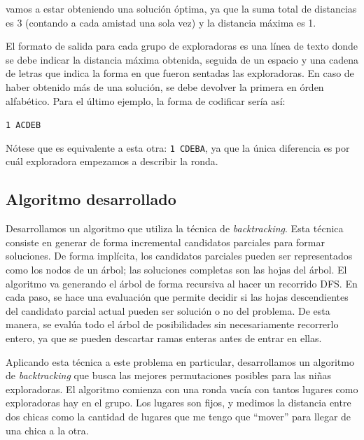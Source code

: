 vamos a estar obteniendo una solución óptima, ya que la suma total de distancias es 3 (contando a cada amistad una sola vez) y la distancia máxima es 1.

El formato de salida para cada grupo de exploradoras es una línea de texto donde se debe indicar la distancia máxima obtenida, seguida de un espacio y una cadena de letras que indica la forma en que fueron sentadas las exploradoras. En caso de haber obtenido más de una solución, se debe devolver la primera en órden alfabético. Para el último ejemplo, la forma de codificar sería así:

\texttt{1 ACDEB}

Nótese que es equivalente a esta otra: \texttt{1 CDEBA}, ya que la única diferencia es por cuál exploradora empezamos a describir la ronda.



\subsection{Algoritmo desarrollado}

Desarrollamos un algoritmo que utiliza la técnica de \textit{backtracking}. Esta técnica consiste en generar de forma incremental candidatos parciales para formar soluciones. De forma implícita, los candidatos parciales pueden ser representados como los nodos de un árbol; las soluciones completas son las hojas del árbol. El algoritmo va generando el árbol de forma recursiva al hacer un recorrido DFS. En cada paso, se hace una evaluación que permite decidir si las hojas descendientes del candidato parcial actual pueden ser solución o no del problema. De esta manera, se evalúa todo el árbol de posibilidades sin necesariamente recorrerlo entero, ya que se pueden descartar ramas enteras antes de entrar en ellas.

Aplicando esta técnica a este problema en particular, desarrollamos un algoritmo de \textit{backtracking} que busca las mejores permutaciones posibles para las niñas exploradoras. El algoritmo comienza con una ronda vacía con tantos lugares como exploradoras hay en el grupo. Los lugares son fijos, y medimos la distancia entre dos chicas como la cantidad de lugares que me tengo que ``mover'' para llegar de una chica a la otra.

